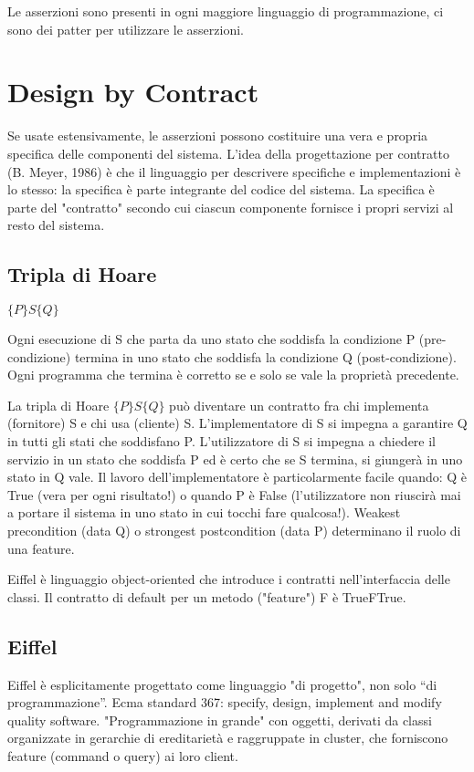 \documentclass[a4paper,12pt,titlepage,oneside]{book}
\begin{document}
    Le asserzioni sono presenti in ogni maggiore linguaggio di programmazione, ci sono dei patter per utilizzare le asserzioni.

\chapter{Design by Contract}
    Se usate estensivamente, le asserzioni possono costituire una vera e propria specifica delle componenti del sistema.
    L'idea della progettazione per contratto (B. Meyer, 1986) è che il linguaggio per descrivere specifiche e implementazioni è lo stesso: la specifica è parte integrante del codice del sistema.
    La specifica è parte del "contratto" secondo cui ciascun componente fornisce i propri servizi al resto del sistema.

\section{Tripla di Hoare}
$\{P\}S\{Q\}$

    Ogni esecuzione di S che parta da uno stato che soddisfa la condizione P (pre-condizione) termina in uno stato che soddisfa la condizione Q (post-condizione).
    Ogni programma che termina è corretto se e solo se vale la proprietà precedente.

    La tripla di Hoare $\{P\}S\{Q\}$ può diventare un contratto fra chi implementa (fornitore) S e chi usa (cliente) S.
    L'implementatore di S si impegna a garantire Q in tutti gli stati che soddisfano P.
    L'utilizzatore di S si impegna a chiedere il servizio in un stato che soddisfa P ed è certo che se S termina, si giungerà in uno stato in Q vale.
    Il lavoro dell'implementatore è particolarmente facile quando: Q è True (vera per ogni risultato!) o quando P è False (l’utilizzatore non riuscirà mai a portare il sistema in uno stato in cui tocchi fare qualcosa!). 
    Weakest precondition (data Q) o strongest postcondition (data P) determinano il ruolo di una feature.

    Eiffel è linguaggio object-oriented che introduce i contratti nell'interfaccia delle classi. Il contratto di default per un metodo ("feature") F è {True}F{True}.

\section{Eiffel}
    Eiffel è esplicitamente progettato come linguaggio "di progetto", non solo “di programmazione”.
    Ecma standard 367: specify, design, implement and modify quality software.
    "Programmazione in grande" con oggetti, derivati da classi organizzate in gerarchie di ereditarietà e raggruppate in cluster, che forniscono feature (command o query) ai loro client.
\end{document}
